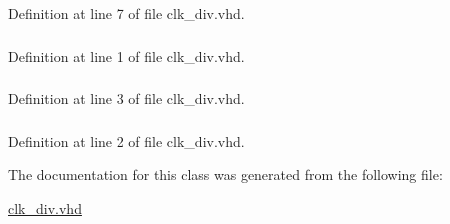 Definition at line 7 of file clk\+\_\+div.\+vhd.

\hypertarget{classclk__div_ae4f03c286607f3181e16b9aa12d0c6d4}{}
\subsubsection[{I\+E\+E\+E}]{\hspace{0.3cm}{\ttfamily [Library]}}\label{classclk__div_ae4f03c286607f3181e16b9aa12d0c6d4}


Definition at line 1 of file clk\+\_\+div.\+vhd.

\hypertarget{classclk__div_aa4b2b25246a821511120e3149b003563}{}
\subsubsection[{S\+T\+D\+\_\+\+L\+O\+G\+I\+C\+\_\+1164}]{\hspace{0.3cm}{\ttfamily [Package]}}\label{classclk__div_aa4b2b25246a821511120e3149b003563}


Definition at line 3 of file clk\+\_\+div.\+vhd.

\hypertarget{classclk__div_a241c3e72dd8024cc8ae831b1b2aed7db}{}
\subsubsection[{S\+T\+D\+\_\+\+L\+O\+G\+I\+C\+\_\+\+U\+N\+S\+I\+G\+N\+E\+D}]{\hspace{0.3cm}{\ttfamily [Package]}}\label{classclk__div_a241c3e72dd8024cc8ae831b1b2aed7db}


Definition at line 2 of file clk\+\_\+div.\+vhd.



The documentation for this class was generated from the following file\+:\begin{DoxyCompactItemize}
\item 
\hyperlink{clk__div_8vhd}{clk\+\_\+div.\+vhd}\end{DoxyCompactItemize}
